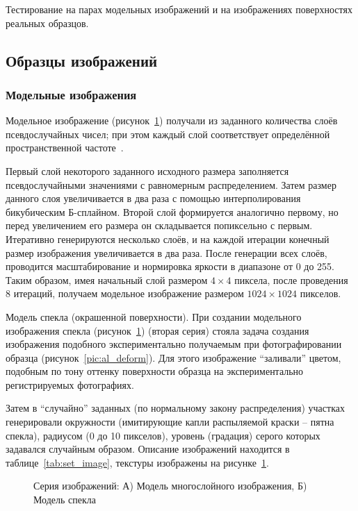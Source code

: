 Тестирование  на парах модельных изображений и на изображениях поверхностях реальных образцов.
\subsection{Образцы изображений}
\subsubsection{Модельные изображения}\label{mod_image}

Модельное изображение (рисунок~\ref{pic:gray_mix}) получали из заданного количества слоёв псевдослучайных чисел; при этом каждый слой соответствует определённой пространственной частоте~\cite{pan_15}. 

Первый слой некоторого заданного исходного размера заполняется псевдослучайными значениями с равномерным распределением. Затем размер данного слоя увеличивается в два раза с помощью интерполирования бикубическим Б-сплайном. Второй слой формируется аналогично первому, но перед увеличением его размера он складывается попиксельно с первым. 
Итеративно генерируются несколько слоёв, и на каждой итерации конечный размер изображения увеличивается в два раза. После генерации всех слоёв, проводится масштабирование и нормировка яркости в диапазоне от 0 до 255. Таким образом, имея начальный слой размером $4 \times 4$ пиксела, после проведения 8 итераций, получаем модельное изображение размером $1024 \times 1024$ пикселов.

Модель спекла (окрашенной поверхности). При создании модельного изображения спекла (рисунок~\ref{pic:gray_mix}) (вторая серия) стояла задача создания изображения подобного экспериментально получаемым при фотографировании образца (рисунок~\ref{pic:al_deform}). Для этого изображение ``заливали'' цветом, подобным по тону оттенку поверхности образца на экспериментально регистрируемых фотографиях. 

Затем в ``случайно'' заданных (по нормальному закону распределения) участках генерировали окружности (имитирующие капли распыляемой краски – пятна спекла), радиусом (0 до 10 пикселов), уровень (градация) серого которых задавался случайным образом. Описание изображений находится в таблице~\ref{tab:set_image}, текстуры изображены на рисунке~\ref{pic:gray_mix}.

\begin{figure}[h!]
\caption{Серия изображений: А) Модель многослойного изображения, Б) Модель спекла}
\label{pic:gray_mix}
\end{figure}

